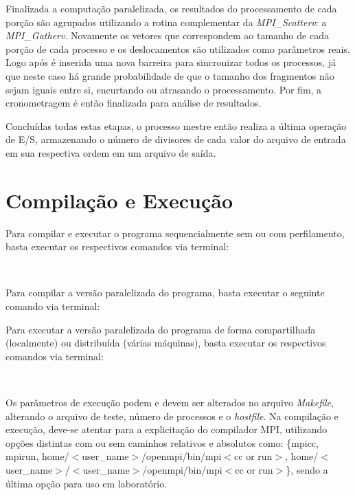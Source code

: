 \documentclass[a4paper, 12pt]{article}
\begin{document}
Finalizada a computação paralelizada, os resultados do processamento de cada porção são agrupados utilizando a rotina complementar da \emph{MPI\_Scatterv}: a \emph{MPI\_Gatherv}. Novamente os vetores que correspondem ao tamanho de cada porção de cada processo e os deslocamentos são utilizados como parâmetros reais. Logo após é inserida uma nova barreira para sincronizar todos os processos, já que neste caso há grande probabilidade de que o tamanho dos fragmentos não sejam iguais entre si, encurtando ou atrasando o processamento. Por fim, a cronometragem é então finalizada para análise de resultados.

Concluídas todas estas etapas, o processo mestre então realiza a última operação de E/S, armazenando o número de divisores de cada valor do arquivo de entrada em sua respectiva ordem em um arquivo de saída.

\section{Compilação e Execução}

\noindent Para compilar e executar o programa sequencialmente sem ou com perfilamento, basta executar os respectivos comandos via terminal:

\begin{center}
    \\
    \vspace{0.5cm}
\end{center}

\noindent Para compilar a versão paralelizada do programa, basta executar o seguinte comando via terminal:

\begin{center}
\end{center}

\noindent Para executar a versão paralelizada do programa de forma compartilhada (localmente) ou distribuída (várias máquinas), basta executar os respectivos comandos via terminal:

\begin{center}
    \\
    \vspace{0.5cm}
\end{center}

Os parâmetros de execução podem e devem ser alterados no arquivo \emph{Makefile}, alterando o arquivo de teste, número de processos e o \emph{hostfile}. Na compilação e execução, deve-se atentar para a explicitação do compilador MPI, utilizando opções distintas com ou sem caminhos relativos e absolutos como: \{mpicc, mpirun, home/\(<\)user\_name\(>\)/openmpi/bin/mpi\(<\)cc or run\(>\), home/\(<\)user\_name\(>\)/\(<\)user\_name\(>\)/openmpi/bin/mpi\(<\)cc or run\(>\)\}, sendo a última opção para uso em laboratório.
\end{document}

